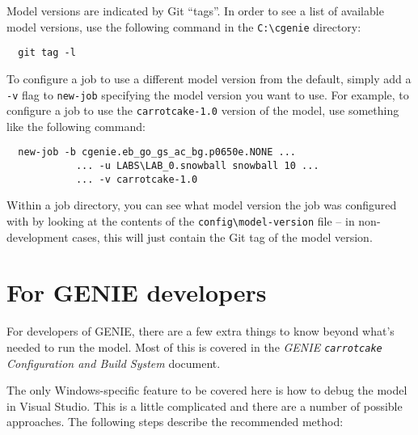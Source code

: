 \documentclass[a4paper,10pt,article]{memoir}
\begin{document}
Model versions are indicated by Git ``tags''.  In order to see a list
of available model versions, use the following command in the
\texttt{C:\textbackslash{}cgenie} directory:
\begin{verbatim}
  git tag -l
\end{verbatim}
To configure a job to use a different model version from the default,
simply add a \texttt{-v} flag to \texttt{new-job} specifying the model
version you want to use.  For example, to configure a job to use the
\texttt{carrotcake-1.0} version of the model, use something like the
following command:
\begin{verbatim}
  new-job -b cgenie.eb_go_gs_ac_bg.p0650e.NONE ...
            ... -u LABS\LAB_0.snowball snowball 10 ...
            ... -v carrotcake-1.0
\end{verbatim}
Within a job directory, you can see what model version the job was
configured with by looking at the contents of the
\texttt{config\textbackslash{}model-version} file -- in
non-development cases, this will just contain the Git tag of the model
version.


\chapter{For GENIE developers}
\label{sec:genie-devs}

For developers of GENIE, there are a few extra things to know beyond
what's needed to run the model.  Most of this is covered in the
\emph{GENIE \texttt{carrotcake} Configuration and Build System} document.

The only Windows-specific feature to be covered here is how to debug
the model in Visual Studio.  This is a little complicated and there
are a number of possible approaches.  The following steps describe the
recommended method:
\end{document}
